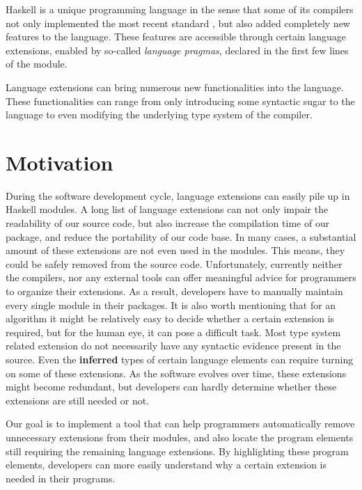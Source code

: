 \documentclass[main.tex]{subfiles}
\begin{document}
	
	Haskell is a unique programming language in the sense that some of its compilers not only implemented the most recent standard \cite{haskell2010-bib}, but also added completely new features to the language. These features are accessible through certain language extensions, enabled by so-called \emph{language pragmas}, declared in the first few lines of the module.
	
	Language extensions can bring numerous new functionalities into the language. These functionalities can range from only introducing some syntactic sugar to the language to even modifying the underlying type system of the compiler. 
	
	\section{Motivation}
	
	During the software development cycle, language extensions can easily pile up in Haskell modules. A long list of language extensions can not only impair the readability of our source code, but also increase the compilation time of our package, and reduce the portability of our code base. In many cases, a substantial amount of these extensions are not even used in the modules. This means, they could be safely removed from the source code. Unfortunately, currently neither the compilers, nor any external tools can offer meaningful advice for programmers to organize their extensions. As a result, developers have to manually maintain every single module in their packages. It is also worth mentioning that for an algorithm it might be relatively easy to decide whether a certain extension is required, but for the human eye, it can pose a difficult task. Most type system related extension do not necessarily have any syntactic evidence present in the source. Even the \textbf{inferred} types of certain language elements can require turning on some of these extensions. As the software evolves over time, these extensions might become redundant, but developers can hardly determine whether these extensions are still needed or not.
	
	Our goal is to implement a tool that can help programmers automatically remove unnecessary extensions from their modules, and also locate the program elements still requiring the remaining language extensions. By highlighting these program elements, developers can more easily understand why a certain extension is needed in their programs.
	
\end{document}
